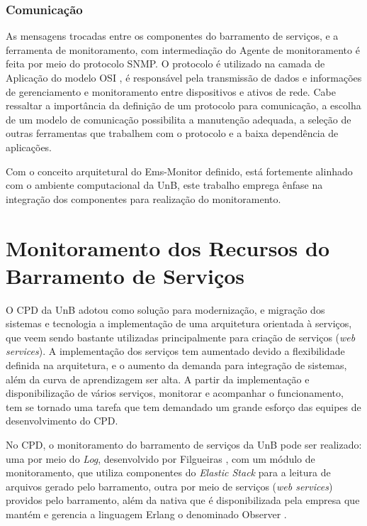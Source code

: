\subsubsection{Comunicação}

As mensagens trocadas entre os componentes do barramento de serviços, e a ferramenta de monitoramento, com intermediação do Agente de monitoramento é feita por meio do protocolo \acrshort{SNMP}. O protocolo é utilizado na camada de Aplicação do modelo OSI \cite{tanenbaum2003redes}, é responsável pela transmissão de dados e informações de gerenciamento e monitoramento entre dispositivos e ativos de rede. Cabe ressaltar a importância da definição de um protocolo para comunicação, a escolha de um modelo de comunicação possibilita a manutenção adequada, a seleção de outras ferramentas que trabalhem com o protocolo e a baixa dependência de aplicações.     

Com o conceito arquitetural do Ems-Monitor definido, está fortemente alinhado com o ambiente computacional da \acrshort{UnB}, este trabalho emprega ênfase na integração dos componentes para realização do monitoramento.   

\section{Monitoramento dos Recursos do Barramento de Serviços}%
\label{recursos_monitoramento}

O \acrshort{CPD} da \acrshort{UnB} adotou como solução para modernização, e migração dos sistemas e tecnologia a implementação de uma arquitetura orientada à serviços, que veem sendo bastante utilizadas principalmente para criação de serviços (\textit{web services}). A implementação dos serviços tem aumentado devido a flexibilidade definida na arquitetura, e o aumento da demanda para integração de sistemas, além da curva de aprendizagem ser alta. A partir da implementação e disponibilização de  vários serviços, monitorar e acompanhar o funcionamento, tem se tornado uma tarefa que tem demandado um grande esforço das equipes de desenvolvimento do \acrshort{CPD}. 

No \acrshort{CPD}, o monitoramento do barramento de serviços da \acrshort{UnB} pode ser realizado: uma por meio do \textit{Log}, desenvolvido por Filgueiras \cite{filgueirasmonitoramento}, com um módulo de monitoramento, que utiliza componentes do \textit{Elastic Stack} para a leitura de arquivos gerado pelo barramento, outra por meio de serviços (\textit{web services}) providos pelo barramento, além da nativa que é disponibilizada pela empresa que mantém e gerencia a linguagem Erlang o denominado Observer \cite{ericssonAB2002-2019}.

